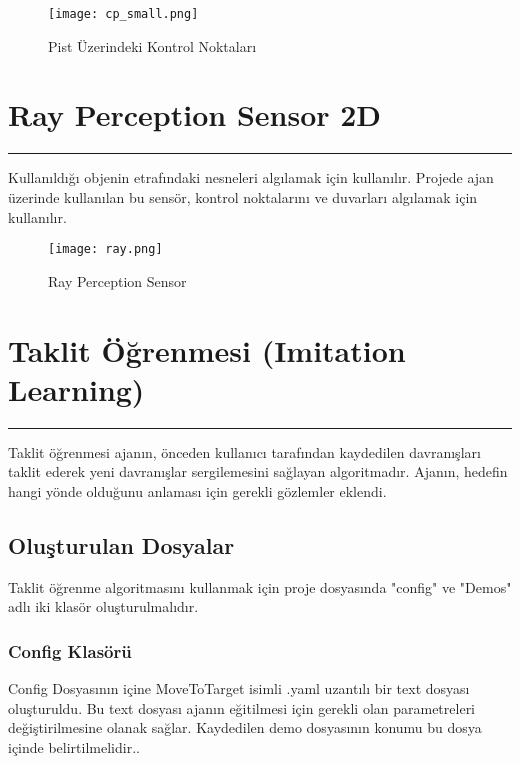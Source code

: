 \documentclass{article}
\begin{document}
\begin{figure}[h]
    \begin{center}
        \texttt{[image: cp\_small.png]}
    \end{center}
      \caption{Pist Üzerindeki Kontrol Noktaları}
\end{figure}

\newpage

\section{Ray Perception Sensor 2D}
\rule{\textwidth}{0.5pt}
\par Kullanıldığı objenin etrafındaki nesneleri algılamak için kullanılır\cite{Ray}. Projede ajan üzerinde kullanılan bu sensör, kontrol noktalarını ve duvarları algılamak için kullanılır. \\[5pt]

\begin{figure}[h]
    \begin{center}
        \texttt{[image: ray.png]}
    \end{center}
      \caption{Ray Perception Sensor}
\end{figure}

\newpage

\section{Taklit Öğrenmesi (Imitation Learning)}
\rule{\textwidth}{0.5pt}
\par Taklit öğrenmesi ajanın, önceden kullanıcı tarafından kaydedilen davranışları taklit ederek yeni davranışlar sergilemesini sağlayan algoritmadır. Ajanın, hedefin hangi yönde olduğunu anlaması için gerekli gözlemler eklendi. \\[5pt]

\subsection{Oluşturulan Dosyalar}
\par Taklit öğrenme algoritmasını kullanmak için proje dosyasında "config" ve "Demos" adlı iki klasör oluşturulmalıdır\cite{imitation2}. \\[5pt]

\subsubsection{Config Klasörü}
\par Config Dosyasının içine MoveToTarget isimli .yaml uzantılı bir text dosyası oluşturuldu. Bu text dosyası ajanın eğitilmesi için gerekli olan parametreleri değiştirilmesine olanak sağlar. Kaydedilen demo dosyasının konumu bu dosya içinde belirtilmelidir.\cite{imitation1}. \\[5pt]
\end{document}

